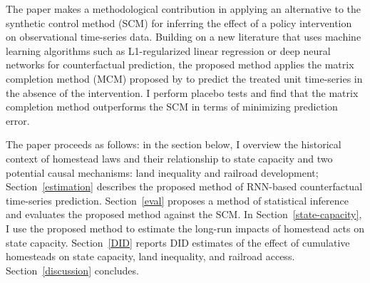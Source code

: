 \documentclass[12pt]{article}
\begin{document}


The paper makes a methodological contribution in applying an alternative to the synthetic control method (SCM) \citep{abadie2010synthetic} for inferring the effect of a policy intervention on observational time-series data. Building on a new literature that uses machine learning algorithms such as L1-regularized linear regression \citep{doudchenko2016balancing} or deep neural networks \citep{2017arXiv171203553P} for counterfactual prediction, the proposed method applies the matrix completion method (MCM) proposed by \citet{athey2017matrix} to predict the treated unit time-series in the absence of the intervention. I perform placebo tests and find that the matrix completion method outperforms the SCM in terms of minimizing prediction error. 

The paper proceeds as follows: in the section below, I overview the historical context of homestead laws and their relationship to state capacity and two potential causal mechanisms: land inequality and railroad development; Section~\ref{estimation} describes the proposed method of RNN-based counterfactual time-series prediction. Section~\ref{eval} proposes a method of statistical inference and evaluates the proposed method against the SCM. In Section~\ref{state-capacity}, I use the proposed method to estimate the long-run impacts of homestead acts on state capacity. Section~\ref{DID} reports DID estimates of the effect of cumulative homesteads on state capacity, land inequality, and railroad access. Section~\ref{discussion} concludes. 
\end{document}
